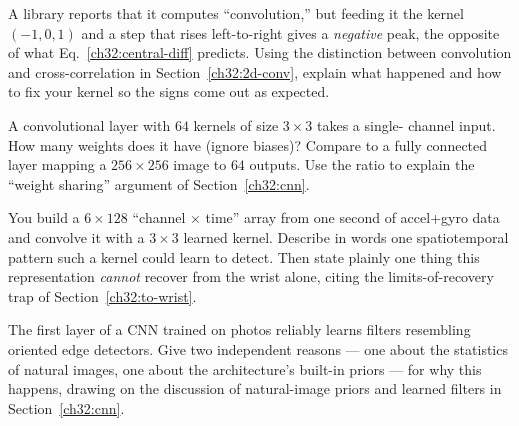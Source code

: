 \begin{exercise}
\label{ch32:ex-corr-vs-conv}
A library reports that it computes ``convolution,'' but feeding it the kernel
$(-1, 0, 1)$ and a step that rises left-to-right gives a \emph{negative} peak,
the opposite of what Eq.~\eqref{ch32:central-diff} predicts. Using the distinction
between convolution and cross-correlation in Section~\ref{ch32:2d-conv}, explain what happened and how to fix
your kernel so the signs come out as expected.
\end{exercise}

\begin{exercise}
\label{ch32:ex-cnn-params}
A convolutional layer with $64$ kernels of size $3\times3$ takes a single-
channel input. How many weights does it have (ignore biases)? Compare to a
fully connected layer mapping a $256\times256$ image to $64$ outputs. Use the
ratio to explain the ``weight sharing'' argument of Section~\ref{ch32:cnn}.
\end{exercise}

\begin{exercise}
\label{ch32:ex-imu-map}
You build a $6 \times 128$ ``channel $\times$ time'' array from one second of
accel+gyro data and convolve it with a $3\times3$ learned kernel. Describe in
words one spatiotemporal pattern such a kernel could learn to detect. Then
state plainly one thing this representation \emph{cannot} recover from the wrist
alone, citing the limits-of-recovery trap of Section~\ref{ch32:to-wrist}.
\end{exercise}

\begin{exercise}
\label{ch32:ex-learned-classic}
The first layer of a CNN trained on photos reliably learns filters resembling
oriented edge detectors. Give two independent reasons --- one about
the statistics of natural images, one about the architecture's built-in priors
--- for why this happens, drawing on the discussion of natural-image priors and learned filters in
Section~\ref{ch32:cnn}.
\end{exercise}
